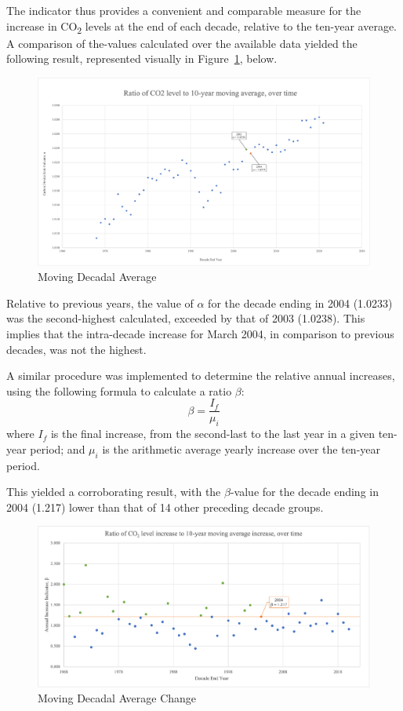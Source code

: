 \documentclass[12pt]{mcmthesis}
\begin{document}
    The indicator thus provides a convenient and comparable measure for the increase in CO\textsubscript{2} levels at the end of each decade, relative to the ten-year average. A comparison of the-values calculated over the available data yielded the following result, represented visually in Figure~\ref{fig:asdf}, below.
%
    \begin{figure}[h]
        \centering
        \includegraphics[width=0.8\linewidth]{1a_10y_mv_avg_rel}
        \caption{Moving Decadal Average}
        \label{fig:asdf}
    \end{figure}

    Relative to previous years, the value of $\alpha$ for the decade ending in 2004 (1.0233) was the second-highest calculated, exceeded by that of 2003 (1.0238). This implies that the intra-decade increase for March 2004, in comparison to previous decades, was not the highest.

    A similar procedure was implemented to determine the relative annual increases, using the following formula to calculate a ratio $\beta$:
%
    \begin{equation}
        \beta = \frac{I_f}{\mu_i}
    \end{equation}
%
    where $I_f$ is the final increase, from the second-last to the last year in a given ten-year period; and
    $\mu_i$ is the arithmetic average yearly increase over the ten-year period.

    This yielded a corroborating result, with the $\beta$-value for the decade ending in 2004 (1.217) lower than that of 14 other preceding decade groups.
%
    \begin{figure}[h]
        \centering
        \includegraphics[width=0.8\linewidth]{1a_10y_mv_avg_chg_rel}
        \caption{Moving Decadal Average Change}
        \label{fig:asdfasdf}
    \end{figure}
%
\end{document}
